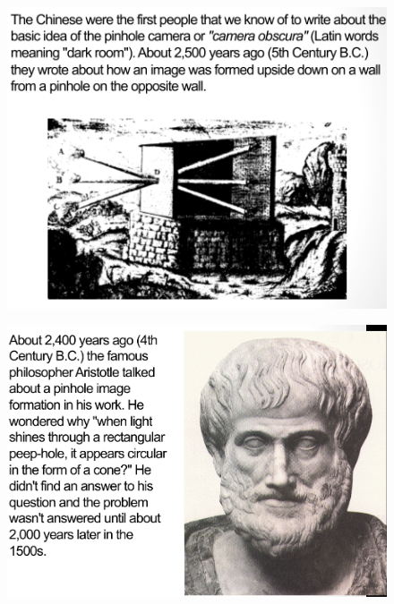 \documentclass{beamer}
\begin{document}
\begin{frame}
	\begin{figure}
		\centering
		\includegraphics[scale=0.4]{65.jpg}
	\end{figure}
\end{frame}

\begin{frame}
	\begin{figure}
		\centering
		\includegraphics[scale=0.4]{66.jpg}
	\end{figure}
\end{frame}
\end{document}

